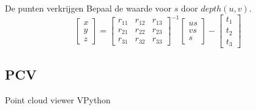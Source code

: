 \documentclass{beamer}
\begin{document}
\begin{frame}{De punten verkrijgen}
Bepaal de waarde voor $s$ door $depth(u,v)$.
$$
\left[ \begin{array}{c} 
x\\
y\\
z\end{array} \right] 
=
\left[ \begin{array}{ccc} 
r_{11} & r_{12} & r_{13}\\
r_{21} & r_{22} & r_{23}\\
r_{31} & r_{32} & r_{33}
\end{array} \right]^{-1}
\left[ \begin{array}{c} 
u s\\
v s\\
s \end{array} \right]
-
\left[ \begin{array}{c} 
t_{1}\\
t_{2}\\
t_{3}
\end{array} \right]
$$
\end{frame}
\subsection{PCV}
\begin{frame}{Point cloud viewer}
VPython
\end{frame}

\begin{frame}

\end{frame}
\section{}
\end{document}
